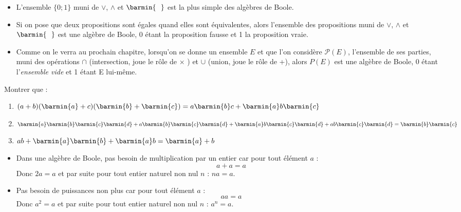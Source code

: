 \begin{exemple}[s]
    \begin{itemize}
        \item 	L'ensemble $\lbrace 0;1\rbrace$ muni de $\vee$, $\wedge$ et $\barmin{\ \ }$ est la plus simple des algèbres de Boole.
        \item 	Si on pose que deux propositions sont égales quand elles sont équivalentes, alors l'ensemble des propositions muni de $\vee$, $\wedge$ et $\barmin{\ \ }$  est une algèbre de Boole,
              0 étant la proposition fausse et 1 la proposition vraie.
        \item 	Comme on le verra au prochain chapitre, lorsqu'on se donne un ensemble $E$ et que l'on considère $\mathcal{P}(E)$, l'ensemble de ses parties, muni des opérations $\cap$ (intersection, joue le rôle de $\times$ ) et $\cup$ (union, joue le rôle de +), alors $P(E)$ est une algèbre de Boole, 0 étant l'\textit{ensemble vide} et 1 étant E lui-même.
    \end{itemize}
\end{exemple}

\begin{exercice}[]
    Montrer que :
    \begin{enumerate}
        \item 	$(a+b)(\barmin{a}+c)(\barmin{b}+\barmin{c})=a\barmin{b}c+\barmin{a}b\barmin{c}$
        \item 	$\barmin{a}\barmin{b}\barmin{c}\barmin{d}+a\barmin{b}\barmin{c}\barmin{d}+	\barmin{a}b\barmin{c}\barmin{d}+ab\barmin{c}\barmin{d}=\barmin{b}\barmin{c}$
        \item 	$ab+\barmin{a}\barmin{b}+ \barmin{a}b=\barmin{a}+b$
    \end{enumerate}
\end{exercice}

\begin{propriete}[s]
    \begin{itemize}
        \item 			Dans une algèbre de Boole, pas besoin de multiplication par un entier car pour tout élément $a$ :
              $$a+a = a$$
              Donc $2a = a$ et par suite pour tout entier naturel non nul $n$ : $na=a$.
        \item Pas besoin de puissances non plus  car pour tout élément $a$ :
              $$aa = a$$
              Donc $a^2 = a$ et par suite pour tout entier naturel non nul $n$ : $a^n=a$.
    \end{itemize}
\end{propriete}

